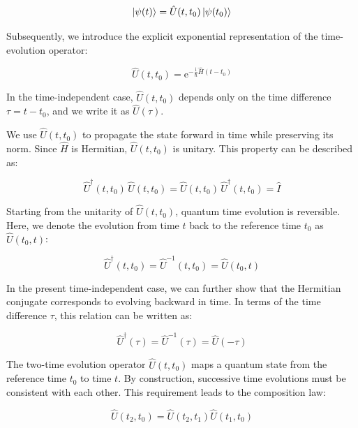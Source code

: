 \begin{equation}
    \ket{\psi(t)}=\hat{U}(t,t_0)\ket{\psi(t_0)}
\label{state_time_evolution}
\end{equation}

Subsequently, we introduce the explicit exponential representation of the time-evolution operator:

\begin{equation}
    \hat{U}(t,t_0)=\mathrm{e}^{-\frac{\mathrm{i}}{\hbar}\hat{H}(t-t_0)}
\label{time_evolution_operator}
\end{equation}

In the time-independent case, $\hat{U}(t,t_0)$ depends only on the time difference $\tau=t-t_0$, and we write it as $\hat{U}(\tau)$.

We use $\hat{U}(t,t_0)$ to propagate the state forward in time while preserving its norm.
Since $\hat{H}$ is Hermitian, $\hat{U}(t,t_0)$ is unitary.
This property can be described as:

\begin{equation}
    \hat{U}^\dagger(t,t_0)\,\hat{U}(t,t_0)=\hat{U}(t,t_0)\,\hat{U}^\dagger(t,t_0) = \hat{I}
\label{evolution_unitarity}
\end{equation}

Starting from the unitarity of $\hat{U}(t,t_0)$, quantum time evolution is reversible.
Here, we denote the evolution from time $t$ back to the reference time $t_0$ as $\hat{U}(t_0,t)$:

\begin{equation}
    \hat{U}^{\dagger}(t,t_0)= \hat{U}^{-1}(t,t_0) = \hat{U}(t_0,t)
\label{time_evolution_reversible}
\end{equation}

In the present time-independent case, we can further show that the Hermitian conjugate corresponds to evolving backward in time.
In terms of the time difference $\tau$, this relation can be written as:

\begin{equation}
    \hat{U}^{\dagger}(\tau)= \hat{U}^{-1}(\tau) = \hat{U}(-\tau)
\label{time_evolution_reversible_tau}
\end{equation}

The two-time evolution operator $\hat{U}(t,t_0)$ maps a quantum state from the reference time $t_0$ to time $t$.
By construction, successive time evolutions must be consistent with each other.
This requirement leads to the composition law:

\begin{equation}
    \hat{U}(t_2,t_0)=\hat{U}(t_2,t_1)\hat{U}(t_1,t_0)
\label{composition_law_time_evolution}
\end{equation}


